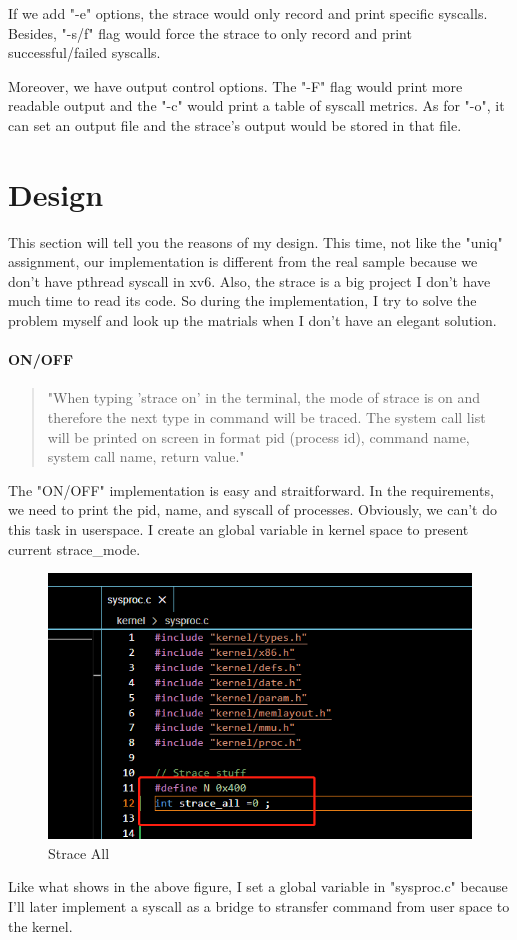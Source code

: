 \documentclass[11pt,oneside,a4paper]{article}
\begin{document}
If we add "-e" options, the strace would only record and print specific syscalls. 
Besides, "-s/f" flag would force the strace to only record and print successful/failed
syscalls. 

Moreover, we have output control options. The "-F" flag would print more readable 
output and the "-c" would print a table of syscall metrics. As for "-o", it can set 
an output file and the strace's output would be stored in that file.

\section{Design}

This section will tell you the reasons of my design. 
This time, not like the "uniq" assignment, our implementation is different 
from the real sample because we don't have pthread syscall in xv6. Also, the 
strace is a big project I don't have much time to read its code. So during the 
implementation, I try to solve the problem myself and look up the matrials when 
I don't have an elegant solution.

\paragraph*{ON/OFF}

\begin{quotation}
    "When typing 'strace on' in the terminal, the mode of strace is on and therefore the next type in
command will be traced. The system call list will be printed on screen in format pid (process id),
command name, system call name, return value."
\end{quotation}
The "ON/OFF" implementation is easy and straitforward. In the requirements, we need
to print the pid, name, and syscall of processes. Obviously, we can't do this task
in userspace. I create an global variable in kernel space to present current 
strace\_mode.
\begin{figure}[H]
    \includegraphics[width=4.75in]{1-5.png}
    \centering
    \caption{Strace All}
\end{figure}
Like what shows in the above figure, I set a global variable in "sysproc.c" because I'll
later implement a syscall as a bridge to stransfer command from user space to the kernel.
\end{document}
